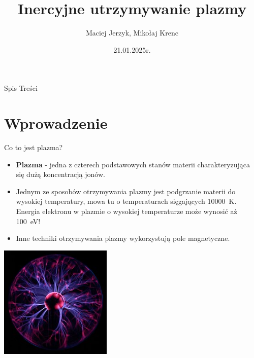 \documentclass[10pt]{beamer}
\title{Inercyjne utrzymywanie plazmy}
\subtitle{}
\author{Maciej Jerzyk, Mikołaj Krenc}
\date{21.01.2025r.}
\begin{document}
    \begin{frame}
        \titlepage{}
    \end{frame}

    \begin{frame}{Spis Treści}
        \tableofcontents
    \end{frame}

    \section{Wprowadzenie}

        \begin{frame}{Co to jest plazma?}
            \begin{itemize}
                \item \textbf{Plazma} - jedna z czterech podstawowych stanów materii charakteryzująca się dużą koncentracją jonów.
                \item Jednym ze sposobów otrzymywania plazmy jest podgrzanie materii do wysokiej temperatury, mowa tu o temperaturach sięgających 10000\ K. Energia elektronu w plazmie o wysokiej temperaturze może wynosić aż 100\ eV!
                \item Inne techniki otrzymywania plazmy wykorzystują pole magnetyczne.
            \end{itemize}

            \raggedright{}
            \includegraphics[width=0.4\textwidth]{lamp.jpg}

        \end{frame}
\end{document}
